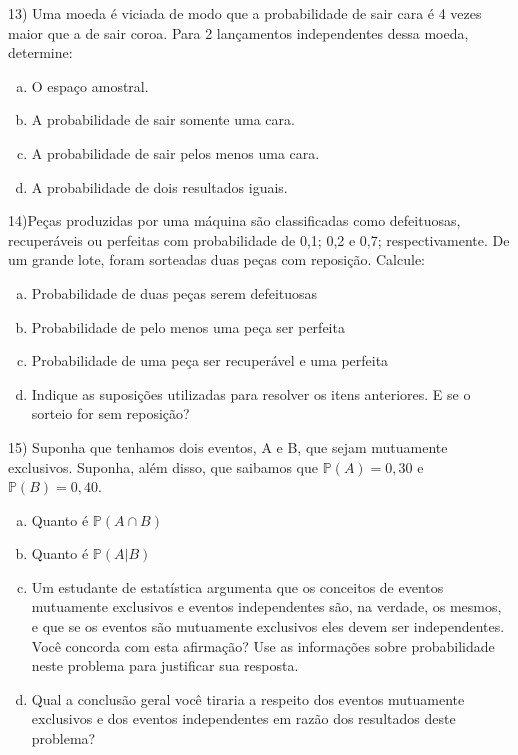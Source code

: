 \documentclass{article}
\begin{document}
13) Uma moeda é viciada de modo que a probabilidade de sair cara é 4 vezes maior que a de sair coroa. Para 2 lançamentos independentes dessa moeda, determine:

\begin{enumerate}[a)] %
    \item O espaço amostral.
    \item A probabilidade de sair somente uma cara.
    \item A probabilidade de sair pelos menos uma cara.
    \item A probabilidade de dois resultados iguais.
\end{enumerate}


14)Peças produzidas por uma máquina são classificadas como defeituosas,
recuperáveis ou perfeitas com probabilidade de 0,1; 0,2 e 0,7; respectivamente.
De um grande lote, foram sorteadas duas peças com reposição. Calcule:

\begin{enumerate}[a)] %
    \item Probabilidade de duas peças serem defeituosas
    \item Probabilidade de pelo menos uma peça ser perfeita
    \item Probabilidade de uma peça ser recuperável e uma perfeita
    \item Indique as suposições utilizadas para resolver os itens anteriores. E se o sorteio for sem reposição?
\end{enumerate}

15) Suponha que tenhamos dois eventos, A e B, que sejam mutuamente exclusivos. Suponha, além disso, que saibamos que $\mathds{P}(A) = 0,30$ e $\mathds{P}(B) = 0,40$.

\begin{enumerate}[a)] %
    \item Quanto é $\mathds{P}(A \cap B)$
    \item Quanto é $\mathds{P}(A | B)$
    \item Um estudante de estatística argumenta que os conceitos de eventos mutuamente exclusivos e eventos independentes são, na verdade, os mesmos, e que se os eventos são mutuamente exclusivos eles devem ser independentes. Você concorda com esta afirmação? Use as informações sobre probabilidade neste problema para justificar sua resposta. 
    \item Qual a conclusão geral você tiraria a respeito dos eventos mutuamente exclusivos e dos eventos independentes em razão dos resultados deste problema?
\end{enumerate}
\end{document}
